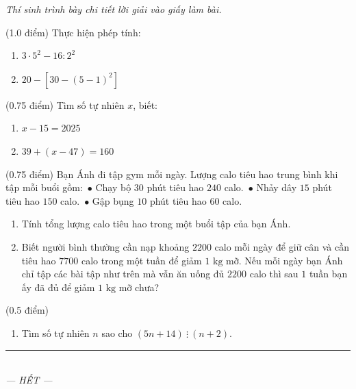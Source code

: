 \documentclass[12pt,a4paper]{article}
\begin{document}
\textit{Thí sinh trình bày chi tiết lời giải vào giấy làm bài.}

\vspace{1mm}
\begin{ex} (1.0 điểm)
Thực hiện phép tính:
\begin{enumerate}[label=\textbf{\alph*)}, leftmargin=0.8cm, itemsep=2pt]
\item $3 \cdot 5^2 - 16 : 2^2$
\item $20 - [30 - (5 - 1)^2]$
\end{enumerate}
\end{ex}
\vspace{1.5mm}

\begin{ex} (0.75 điểm)
Tìm số tự nhiên $x$, biết:
\begin{enumerate}[label=\textbf{\alph*)}, leftmargin=0.8cm, itemsep=2pt]
\item $x - 15 = 2025$
\item $39 + (x - 47) = 160$
\end{enumerate}
\end{ex}
\vspace{1.5mm}

\begin{ex} (0.75 điểm)
Bạn Ánh đi tập gym mỗi ngày. Lượng calo tiêu hao trung bình khi tập mỗi buổi gồm:\
$\bullet$ Chạy bộ $30$ phút tiêu hao $240$ calo.\
$\bullet$ Nhảy dây $15$ phút tiêu hao $150$ calo.\
$\bullet$ Gập bụng $10$ phút tiêu hao $60$ calo.
\begin{enumerate}[label=\textbf{\alph*)}, leftmargin=0.8cm, itemsep=2pt]
\item Tính tổng lượng calo tiêu hao trong một buổi tập của bạn Ánh.
\item Biết người bình thường cần nạp khoảng $2200$ calo mỗi ngày để giữ cân và cần tiêu hao $7700$ calo trong một tuần để giảm $1\text{ kg}$ mỡ. Nếu mỗi ngày bạn Ánh chỉ tập các bài tập như trên mà vẫn ăn uống đủ $2200$ calo thì sau $1$ tuần bạn ấy đã đủ để giảm $1\text{ kg}$ mỡ chưa?
\end{enumerate}
\end{ex}
\vspace{1.5mm}

\begin{ex} (0.5 điểm)
\begin{enumerate}[label=\textbf{\alph*)}, leftmargin=0.8cm, itemsep=2pt]
\item Tìm số tự nhiên $n$ sao cho $(5n + 14) \ \vdots \ (n + 2)$.
\end{enumerate}
\end{ex}
\vspace{1.5mm}


\begin{center}
\rule{4cm}{0.4pt}\\
\textit{--- HẾT ---}
\end{center}
\end{document}
